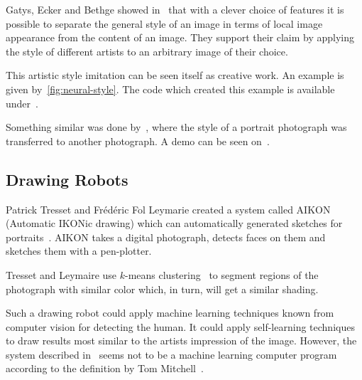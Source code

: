 Gatys, Ecker and Bethge showed in~\cite{gatys2015neural} that with a clever
choice of features it is possible to separate the general style of an image in
terms of local image appearance from the content of an image. They support
their claim by applying the style of different artists to an arbitrary image of
their choice.

This artistic style imitation can be seen itself as creative work. An example
is given by~\cref{fig:neural-style}. The code which created this example is
available under~\cite{Johnson2016}.

Something similar was done by~\cite{shih2014style}, where the style of a
portrait photograph was transferred to another photograph. A demo can be seen
on~\cite{Shih2014}.


\subsection{Drawing Robots}
Patrick Tresset and Frédéric Fol Leymarie created a system called AIKON
(Automatic IKONic drawing) which can automatically generated sketches for
portraits~\cite{tresset2005generative}. AIKON takes a digital photograph,
detects faces on them and sketches them with a pen-plotter.

Tresset and Leymaire use $k$-means clustering~\cite{1017616} to segment regions
of the photograph with similar color which, in turn, will get a similar
shading.

Such a drawing robot could apply machine learning techniques known from
computer vision for detecting the human. It could apply self-learning
techniques to draw results most similar to the artists impression of the image.
However, the system described in~\cite{tresset2005generative} seems not to be a
machine learning computer program according to the definition by Tom
Mitchell~\cite{Mitchell97}.
